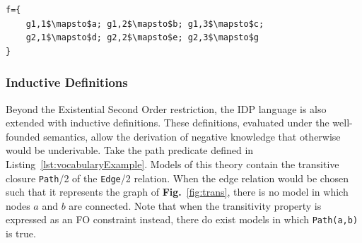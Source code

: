 \begin{minipage}{\linewidth}
    \begin{minipage}{0.5\linewidth}
    \begin{lstlisting}[mathescape,caption={A possible assignment for f s.t. it represents no homomorphism from Fig.~\ref{fig:ex2-cand} to Fig.~\ref{fig:ex2-neg}}, label=lst:invalidf]
f={
    g1,1$\mapsto$a; g1,2$\mapsto$b; g1,3$\mapsto$c;
    g2,1$\mapsto$d; g2,2$\mapsto$e; g2,3$\mapsto$g
}
    \end{lstlisting}
    \end{minipage}
    \begin{minipage}{0.5\linewidth}
    \centering
   \label{fig:trans}
    \end{minipage}
\end{minipage}



\subsubsection{Inductive Definitions}
Beyond the Existential Second Order restriction, the IDP language is also extended with inductive definitions. These definitions, evaluated under the well-founded semantics, allow the derivation of negative knowledge that otherwise would be underivable.
Take the path predicate defined in Listing~\ref{lst:vocabularyExample}.
Models of this theory contain the transitive closure \lstinline|Path|/2 of the \lstinline|Edge|/2 relation.
When the edge relation would be chosen such that it represents the graph of \textbf{Fig.}~\ref{fig:trans}, there is no model in which nodes $a$ and $b$ are connected. Note that when the transitivity property is expressed as an FO constraint instead, there do exist models in which \lstinline|Path(a,b)| is true.

